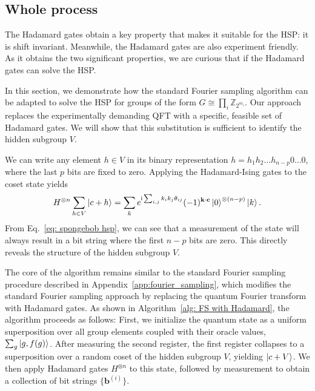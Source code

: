 \documentclass[aps,reprint,showpacs,tightenlines, twocolumn]{revtex4-2}
\newcommand{\ii}{\mathsf{i}}
\newcommand{\ZZ}{\mathbb{Z}}
\begin{document}
\subsection{Whole process}
The Hadamard gates obtain a key property that makes it suitable for the HSP: it is shift invariant. Meanwhile, the Hadamard gates are also experiment friendly. As it obtains the two significant properties, we are curious that if the Hadamard gates can solve the HSP.

In this section, we demonstrate how the standard Fourier sampling algorithm can be adapted to solve the HSP for groups of the form $G \cong \prod_i \ZZ_{2^{m_i}}$. Our approach replaces the experimentally demanding QFT with a specific, feasible set of Hadamard gates. We will show that this substitution is sufficient to identify the hidden subgroup $V$.


We can write any element $h \in V$ in its binary representation $h = h_1 h_2 \dots h_{n-p} 0 \dots 0$, where the last $p$ bits are fixed to zero. Applying the Hadamard-Ising gates to the coset state yields
\begin{equation}
\label{eq: spongebob hsp}
H^{\otimes n} \sum_{h \in V} \ket{c+h} = \sum_k e^{\ii \sum_{i,j} k_i k_j \theta_{ij}} (-1)^{\mathbf{k}\cdot \mathbf{c}} \ket{0}^{\otimes (n-p)}\ket{k}.
\end{equation}
From Eq.~\eqref{eq: spongebob hsp}, we can see that a measurement of the state will always result in a bit string where the first $n-p$ bits are zero. This directly reveals the structure of the hidden subgroup $V$.

The core of the algorithm remains similar to the standard Fourier sampling procedure described in Appendix~\ref{app:fourier_sampling}, which modifies the standard Fourier sampling approach by replacing the quantum Fourier transform with Hadamard gates. As shown in Algorithm~\ref{alg: FS with Hadamard}, the algorithm proceeds as follows: First, we initialize the quantum state as a uniform superposition over all group elements coupled with their oracle values, $\sum_g \ket{g, f(g)}$. After measuring the second register, the first register collapses to a superposition over a random coset of the hidden subgroup $V$, yielding $\ket{c+V}$. We then apply Hadamard gates $H^{\otimes n}$ to this state, followed by measurement to obtain a collection of bit strings $\{\mathbf{b}^{(i)}\}$.
\end{document}
